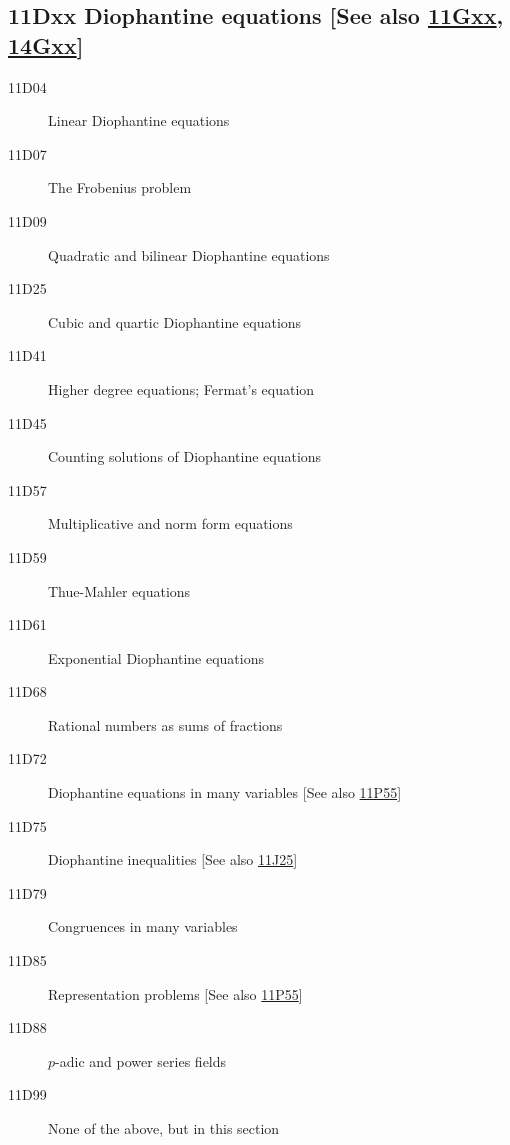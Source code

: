 \subsection*{11Dxx  Diophantine equations [See also \hyperref[11Gxx]{11Gxx}, \hyperref[14Gxx]{14Gxx}] }\label{11Dxx}
\begin{description}  
\item [11D04]\label{11D04} Linear Diophantine equations
\item [11D07]\label{11D07} The Frobenius problem
\item [11D09]\label{11D09} Quadratic and bilinear Diophantine equations
\item [11D25]\label{11D25} Cubic and quartic Diophantine equations
\item [11D41]\label{11D41} Higher degree equations; Fermat's equation
\item [11D45]\label{11D45} Counting solutions of Diophantine equations
\item [11D57]\label{11D57} Multiplicative and norm form equations
\item [11D59]\label{11D59} Thue-Mahler equations
\item [11D61]\label{11D61} Exponential Diophantine equations
\item [11D68]\label{11D68} Rational numbers as sums of fractions
\item [11D72]\label{11D72} Diophantine equations in many variables [See also \hyperref[11P55]{11P55}]
\item [11D75]\label{11D75} Diophantine inequalities [See also \hyperref[11J25]{11J25}]
\item [11D79]\label{11D79} Congruences in many variables
\item [11D85]\label{11D85} Representation problems [See also \hyperref[11P55]{11P55}]
\item [11D88]\label{11D88} $p$-adic and power series fields
\item [11D99]\label{11D99} None of the above, but in this section
\end{description}
